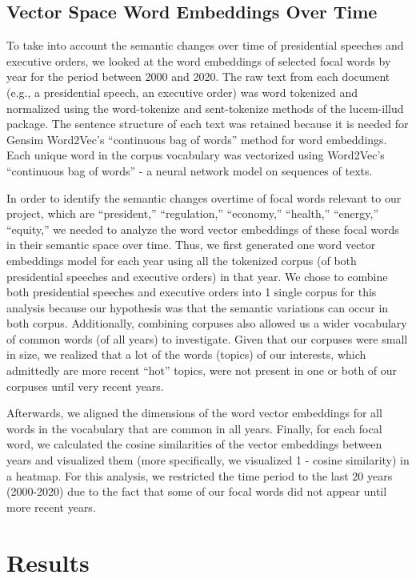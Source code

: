 \documentclass{article}
\begin{document}
{\subsection{Vector Space Word Embeddings Over Time}{To take into account the semantic changes over time of presidential speeches and executive orders, we looked at the word embeddings of selected focal words by year for the period between 2000 and 2020. The raw text from each document (e.g., a presidential speech, an executive order) was word tokenized and normalized using the word-tokenize and sent-tokenize methods of the lucem-illud package. The sentence structure of each text was retained because it is needed for Gensim Word2Vec’s “continuous bag of words” method for word embeddings. Each unique word in the corpus vocabulary was vectorized using Word2Vec’s “continuous bag of words” - a neural network model on sequences of texts. 
	
In order to identify the semantic changes overtime of focal words relevant to our project, which are “president,” “regulation,” “economy,” “health,” “energy,” “equity,” we needed to analyze the word vector embeddings of these focal words in their semantic space over time. Thus, we first generated one word vector embeddings model for each year using all the tokenized corpus (of both presidential speeches and executive orders) in that year. We chose to combine both presidential speeches and executive orders into 1 single corpus for this analysis because our hypothesis was that the semantic variations can occur in both corpus. Additionally, combining corpuses also allowed us a wider vocabulary of common words (of all years) to investigate. Given that our corpuses were small in size, we realized that a lot of the words (topics) of our interests, which admittedly are more recent “hot” topics, were not present in one or both of our corpuses until very recent years.
	
Afterwards, we aligned the dimensions of the word vector embeddings for all words in the vocabulary that are common in all years. Finally, for each focal word, we calculated the cosine similarities of the vector embeddings between years and visualized them (more specifically, we visualized 1 - cosine similarity) in a heatmap. For this analysis, we restricted the time period to the last 20 years (2000-2020) due to the fact that some of our focal words did not appear until more recent years. 
}
\newpage

\section{Results}{	
}}
\end{document}
